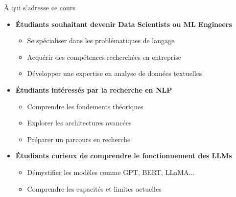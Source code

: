 \documentclass[aspectratio=169,11pt]{beamer}
\begin{document}
\begin{frame}{À qui s'adresse ce cours}
    \begin{itemize}
        \item \textbf{Étudiants souhaitant devenir Data Scientists ou ML Engineers}
        \begin{itemize}
            \item Se spécialiser dans les problématiques de langage
            \item Acquérir des compétences recherchées en entreprise
            \item Développer une expertise en analyse de données textuelles
        \end{itemize}
        \vspace{0.3cm}
        \item \textbf{Étudiants intéressés par la recherche en NLP}
        \begin{itemize}
            \item Comprendre les fondements théoriques
            \item Explorer les architectures avancées
            \item Préparer un parcours en recherche
        \end{itemize}
        \vspace{0.3cm}
        \item \textbf{Étudiants curieux de comprendre le fonctionnement des LLMs}
        \begin{itemize}
            \item Démystifier les modèles comme GPT, BERT, LLaMA...
            \item Comprendre les capacités et limites actuelles
        \end{itemize}
    \end{itemize}
\end{frame}
\end{document}
